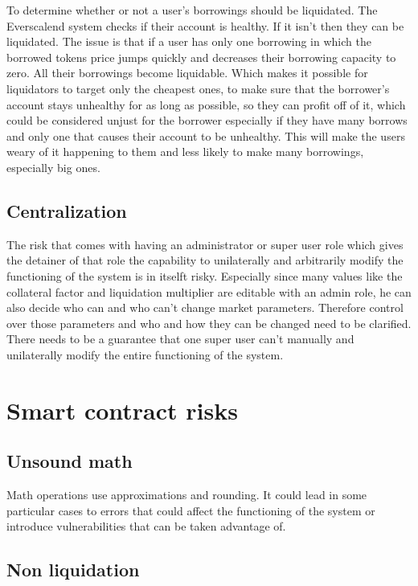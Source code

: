 To determine whether or not a user's borrowings should be liquidated. The Everscalend system checks if their account is healthy. If it isn't then they can be liquidated. The issue is that if a user has only one borrowing in which the borrowed tokens price jumps quickly and decreases their borrowing capacity to zero. All their borrowings become liquidable. Which makes it possible for liquidators to target only the cheapest ones, to make sure that the borrower's account stays unhealthy for as long as possible, so they can profit off of it, which could be considered unjust for the borrower especially if they have many borrows and only one that causes their account to be unhealthy. This will make the users weary of it happening to them and less likely to make many borrowings, especially big ones.

\subsection{Centralization}

The risk that comes with having an administrator or super user role which gives the detainer of that role the capability to unilaterally and arbitrarily modify the functioning of the system is in itselft risky. Especially since many values like the collateral factor and liquidation multiplier are editable with an admin role, he can also decide who can and who can't change market parameters. Therefore control over those parameters and who and how they can be changed need to be clarified. There needs to be a guarantee that one super user can't manually and unilaterally modify the entire functioning of the system.


\section{Smart contract risks}

\subsection{Unsound math}

Math operations use approximations and rounding. It could lead in some particular cases to errors that could affect the functioning of the system or introduce vulnerabilities that can be taken advantage of.

\subsection{Non liquidation}

